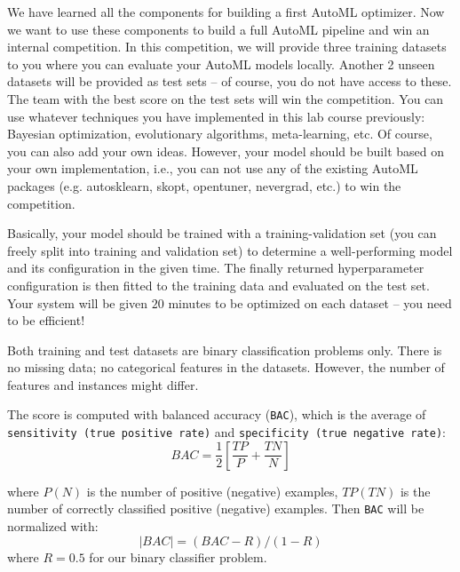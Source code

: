 \documentclass{exam}
\begin{document}
	\gccs
	We have learned all the components for building a first AutoML optimizer. Now we want to use these components to build a full AutoML pipeline and win an internal competition. In this competition, we will provide three training datasets to you where you can evaluate your AutoML models locally. Another 2 unseen datasets will be provided as test sets -- of course, you do not have access to these. The team with the best score on the test sets will win the competition. You can use whatever techniques you have implemented in this lab course previously: Bayesian optimization, evolutionary algorithms, meta-learning, etc. Of course, you can also add your own ideas. However, your model should be built based on your own implementation, i.e., you can not use any of the existing AutoML packages (e.g. autosklearn, skopt, opentuner, nevergrad, etc.) to win the competition.
	
	Basically, your model should be trained with a training-validation set (you can freely split into training and validation set) to determine a well-performing model and its configuration in the given time. The finally returned hyperparameter configuration is then fitted to the training data and evaluated on the test set. Your system will be given $20$ minutes to be optimized on each dataset -- you need to be efficient!
	
	Both training and test datasets are binary classification problems only. There is no missing data; no categorical features in the datasets. However, the number of features and instances might differ. %
	
	The score is computed with balanced accuracy (\texttt{BAC}), which is the average of \texttt{sensitivity (true positive rate)} and \texttt{specificity (true negative rate)}:
	\begin{equation}
	    BAC = \frac{1}{2}\left[ \frac{TP}{P}+\frac{TN}{N}\right]
	\end{equation}
	
	where $P (N)$ is the number of positive (negative) examples, $TP (TN)$ is the number of correctly classified positive (negative) examples. Then \texttt{BAC} will be normalized with:
	\begin{equation}
	    \left| BAC \right| = (BAC-R)/(1-R)
	\end{equation}
	where $R=0.5$ for our binary classifier problem.
	
\end{document}
